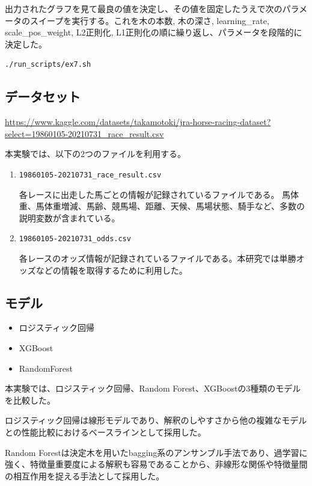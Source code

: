 \documentclass[dvipdfmx, a4paper, 11pt, titlepage]{jsarticle}
\begin{document}
\begin{enumerate}
出力されたグラフを見て最良の値を決定し、その値を固定したうえで次のパラメータのスイープを実行する。これを木の本数, 木の深さ, learning\_rate, scale\_pos\_weight, L2正則化, L1正則化の順に繰り返し、パラメータを段階的に決定した。

\begin{verbatim}
./run_scripts/ex7.sh
\end{verbatim}

\end{enumerate}

\subsection{データセット}
\url{https://www.kaggle.com/datasets/takamotoki/jra-horse-racing-dataset?select=19860105-20210731_race_result.csv}

本実験では、以下の2つのファイルを利用する。


\begin{enumerate}
    \item \texttt{19860105-20210731\_race\_result.csv}

    各レースに出走した馬ごとの情報が記録されているファイルである。
    馬体重、馬体重増減、馬齢、競馬場、距離、天候、馬場状態、騎手など、多数の説明変数が含まれている。

    \item \texttt{19860105-20210731\_odds.csv}

    各レースのオッズ情報が記録されているファイルである。本研究では単勝オッズなどの情報を取得するために利用した。
\end{enumerate}

\subsection{モデル}
\begin{itemize}
 \item ロジスティック回帰
 \item XGBoost
 \item RandomForest
 \end{itemize}
 
本実験では、ロジスティック回帰、Random Forest、XGBoostの3種類のモデルを比較した。

ロジスティック回帰は線形モデルであり、解釈のしやすさから他の複雑なモデルとの性能比較におけるベースラインとして採用した。

Random Forestは決定木を用いたbagging系のアンサンブル手法であり、過学習に強く、特徴量重要度による解釈も容易であることから、非線形な関係や特徴量間の相互作用を捉える手法として採用した。
\end{document}
